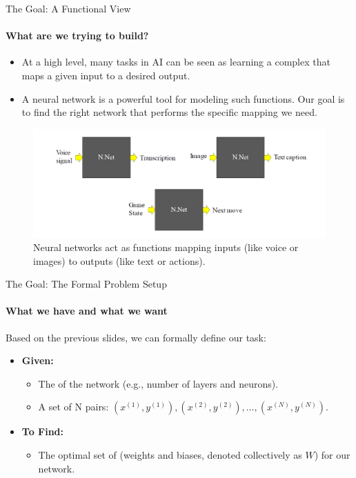 \begin{frame}{The Goal: A Functional View}
    \framesubtitle{What are we trying to build?}
    \small
    \begin{itemize}
        \item At a high level, many tasks in AI can be seen as learning a complex  that maps a given input to a desired output.
        \item A neural network is a powerful tool for modeling such functions. Our goal is to find the right network that performs the specific mapping we need.
    \end{itemize}
    \begin{figure}
        \centering
        \includegraphics[width=0.9\linewidth]{images/nn_as_function.png}
        \caption{Neural networks act as functions mapping inputs (like voice or images) to outputs (like text or actions).}
    \end{figure}
\end{frame}

\begin{frame}{The Goal: The Formal Problem Setup}
    \framesubtitle{What we have and what we want}
    Based on the previous slides, we can formally define our task:
    \begin{itemize}
        \item \textbf{Given:}
        \begin{itemize}
            \item The  of the network (e.g., number of layers and neurons).
            \item A set of N  pairs: $(x^{(1)}, y^{(1)}), (x^{(2)}, y^{(2)}), \dots, (x^{(N)}, y^{(N)})$.
        \end{itemize}
        \medskip
        \item \textbf{To Find:}
        \begin{itemize}
            \item The optimal set of  (weights and biases, denoted collectively as $W$) for our network.
        \end{itemize}
    \end{itemize}
\end{frame}

